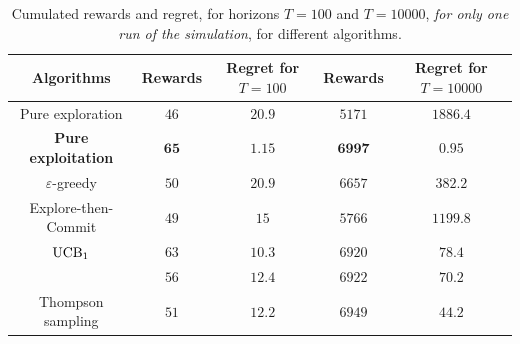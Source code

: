 \begin{table}[!h]
    \begin{small}  %
        \centering
        \begin{tabular}{c|cc|cc}
        \textbf{Algorithms}
        & Rewards
        & Regret for $T=100$
        & Rewards
        & Regret for $T=10000$ \\
            \hline
            Pure exploration
                & $46$ & $20.9$
                & $5171$ & $1886.4$ \\
            \textbf{Pure exploitation}
                & $\mathbf{65}$ & $\mathbf{1.15}$
                & $\mathbf{6997}$ & $\mathbf{0.95}$ \\
            \hline
            $\varepsilon$-greedy
                & $50$ & $20.9$
                & $6657$ & $382.2$ \\
            Explore-then-Commit
                & $49$ & $15$
                & $5766$ & $1199.8$ \\
            \hline
            $\mathrm{UCB}_1$
                & $63$ & $10.3$
                & $6920$ & $78.4$ \\
            \klUCB{}
                & $56$ & $12.4$
                & $6922$ & $70.2$ \\
            \hline
            Thompson sampling
                & $51$ & $12.2$
                & $6949$ & $44.2$ \\
        \end{tabular}
        \caption{Cumulated rewards and regret, for horizons $T=100$ and $T=10000$, \emph{for only one run of the simulation}, for different algorithms.}
        \label{table:2:oneShotResult}
    \end{small}  %
\end{table}

